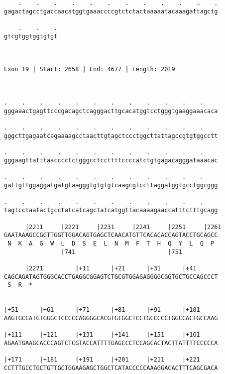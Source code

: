 \documentclass{article}
\begin{document}
\begin{Verbatim}
    .    .    .    .    .    .    .    .    .    .    .    .
gagactagcctgaccaacatggtgaaaccccgtctctactaaaaatacaaagattagctg
                                                            
    .    .    .
gtcgtggtggtgtgt
               
               
 
Exon 19 | Start: 2658 | End: 4677 | Length: 2019



.    .    .    .    .    .    .    .    .    .    .    .    
gggaaactgagttcccgacagctcagggacttgcacatggtcctgggtgaaggaaacaca
                                                            
.    .    .    .    .    .    .    .    .    .    .    .    
gggcttgagaatcagaaaagcctaacttgtagctccctggcttattagccgtgtggcctt
                                                            
.    .    .    .    .    .    .    .    .    .    .    .    
gggaagttatttaacccctctgggcctccttttccccatctgtgagacagggataaacac
                                                            
.    .    .    .    .    .    .    .    .    .    .    .    
gattgttggaggatgatgtaagggtgtgtgtcaagcgtccttaggatggtgcctggcggg
                                                            
.    .    .    .    .    .    .    .    .    .    .    .    
tagtcctaatactgcctatcatcagctatcatggttacaaaagaaccatttctttgcagg
                                                            
      |2211     |2221     |2231     |2241     |2251     |2261
GAATAAAGCCGGTTGGTTGGACAGTGAGCTCAACATGTTCACACACCAGTACCTGCAGCC
 N  K  A  G  W  L  D  S  E  L  N  M  F  T  H  Q  Y  L  Q  P 
                |741                          |751          
  
      |2271         |+11      |+21      |+31      |+41      
CAGCAGATAGTGGGCACCTGAGGCGGAGTCTGCGTGGAGAGGGGCGGTGCTGCCAGCCCT
 S  R  *   
                                                            
  
|+51      |+61      |+71      |+81      |+91      |+101     
AAGTGCCATGTGGGCTCCCCCAGGGGCACGTGTGGCTCCTGCCCCCTGGCCACTGCCAAG
                                                            
|+111     |+121     |+131     |+141     |+151     |+161     
AGAATGAAGCACCCAGTCTCGTACCATTTTGAGCCCTCCAGCACTACTTATTTTCCCCCA
                                                            
|+171     |+181     |+191     |+201     |+211     |+221     
CCTTTGCCTGCTGTTGCTGGAAGAGCTGGCTCATACCCCCAAAGGACACTTTCAGCGACA
                                                            

\end{Verbatim}
\end{document}
